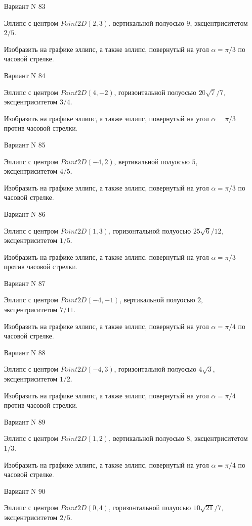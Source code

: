 \documentclass[11pt]{report}
\begin{document}
Вариант N 83

Эллипс с центром $Point2D\left(2, 3\right)$, вертикальной полуосью $9$, эксцентриситетом $2 / 5$.

    Изобразить на графике эллипс, а также эллипс, повернутый на угол $\alpha = $$\pi / 3$ по часовой стрелке.

Вариант N 84

Эллипс с центром $Point2D\left(4, -2\right)$, горизонтальной полуосью $20 \sqrt{7} / 7$, эксцентриситетом $3 / 4$.

    Изобразить на графике эллипс, а также эллипс, повернутый на угол $\alpha = $$\pi / 3$ против часовой стрелки.

Вариант N 85

Эллипс с центром $Point2D\left(-4, 2\right)$, вертикальной полуосью $5$, эксцентриситетом $4 / 5$.

    Изобразить на графике эллипс, а также эллипс, повернутый на угол $\alpha = $$\pi / 3$ по часовой стрелке.

Вариант N 86

Эллипс с центром $Point2D\left(1, 3\right)$, горизонтальной полуосью $25 \sqrt{6} / 12$, эксцентриситетом $1 / 5$.

    Изобразить на графике эллипс, а также эллипс, повернутый на угол $\alpha = $$\pi / 3$ против часовой стрелки.

Вариант N 87

Эллипс с центром $Point2D\left(-4, -1\right)$, вертикальной полуосью $2$, эксцентриситетом $7 / 11$.

    Изобразить на графике эллипс, а также эллипс, повернутый на угол $\alpha = $$\pi / 4$ по часовой стрелке.

Вариант N 88

Эллипс с центром $Point2D\left(-4, 3\right)$, горизонтальной полуосью $4 \sqrt{3}$, эксцентриситетом $1 / 2$.

    Изобразить на графике эллипс, а также эллипс, повернутый на угол $\alpha = $$\pi / 4$ против часовой стрелки.

Вариант N 89

Эллипс с центром $Point2D\left(1, 2\right)$, вертикальной полуосью $8$, эксцентриситетом $1 / 3$.

    Изобразить на графике эллипс, а также эллипс, повернутый на угол $\alpha = $$\pi / 4$ по часовой стрелке.

Вариант N 90

Эллипс с центром $Point2D\left(0, 4\right)$, горизонтальной полуосью $10 \sqrt{21} / 7$, эксцентриситетом $2 / 5$.
\end{document}
